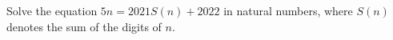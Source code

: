 Solve the equation $5n=2021S(n)+2022$ in natural numbers, where $S(n)$ denotes the sum of the digits of $n$.
